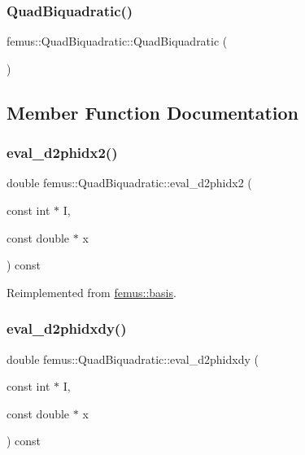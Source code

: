 \subsubsection{\texorpdfstring{Quad\+Biquadratic()}{QuadBiquadratic()}}
{\footnotesize\ttfamily femus\+::\+Quad\+Biquadratic\+::\+Quad\+Biquadratic (\begin{DoxyParamCaption}{ }\end{DoxyParamCaption})\hspace{0.3cm}{\ttfamily [inline]}}



\subsection{Member Function Documentation}
\mbox{\label{classfemus_1_1_quad_biquadratic_ab88f608bc7d87d9639250d165ebafc4e}} 
\subsubsection{\texorpdfstring{eval\+\_\+d2phidx2()}{eval\_d2phidx2()}}
{\footnotesize\ttfamily double femus\+::\+Quad\+Biquadratic\+::eval\+\_\+d2phidx2 (\begin{DoxyParamCaption}\item[{const int $\ast$}]{I,  }\item[{const double $\ast$}]{x }\end{DoxyParamCaption}) const\hspace{0.3cm}{\ttfamily [virtual]}}



Reimplemented from \mbox{\hyperlink{classfemus_1_1basis_a0a9839e75d1c9c8302486fc072eed028}{femus\+::basis}}.

\mbox{\label{classfemus_1_1_quad_biquadratic_aff6de056034d2ef2d51f914a872a8d93}} 
\subsubsection{\texorpdfstring{eval\+\_\+d2phidxdy()}{eval\_d2phidxdy()}}
{\footnotesize\ttfamily double femus\+::\+Quad\+Biquadratic\+::eval\+\_\+d2phidxdy (\begin{DoxyParamCaption}\item[{const int $\ast$}]{I,  }\item[{const double $\ast$}]{x }\end{DoxyParamCaption}) const\hspace{0.3cm}{\ttfamily [virtual]}}



